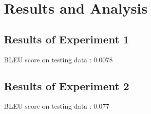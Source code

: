 \section{Results and Analysis} \label{sec: baselines}

\subsection{Results of Experiment 1}
BLEU score on testing data : 0.0078

\subsection{Results of Experiment 2}
BLEU score on testing data : 0.077